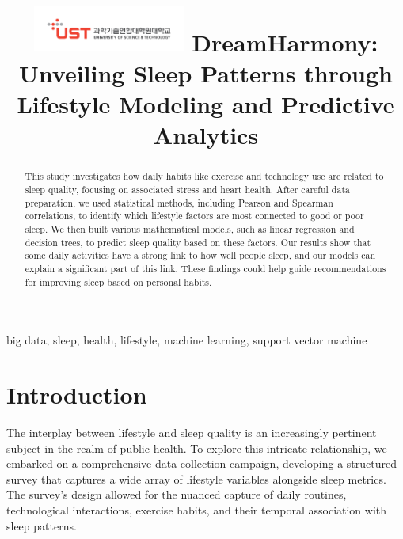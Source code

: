 \documentclass[conference]{IEEEtran}
\begin{document}

\title{\includegraphics[width=5cm]{images/ust.png} \linebreak DreamHarmony: Unveiling Sleep Patterns through Lifestyle Modeling and Predictive Analytics
}


\author{
}
\maketitle

\begin{abstract}
    This study investigates how daily habits like exercise and technology use are related to sleep quality, focusing on associated stress and heart health. After careful data preparation, we used statistical methods, including Pearson\cite{pearson} and Spearman correlations\cite{spearman}, to identify which lifestyle factors are most connected to good or poor sleep. We then built various mathematical models, such as linear regression and decision trees, to predict sleep quality based on these factors. Our results show that some daily activities have a strong link to how well people sleep, and our models can explain a significant part of this link. These findings could help guide recommendations for improving sleep based on personal habits.
\end{abstract}

\begin{IEEEkeywords}
    big data, sleep, health, lifestyle, machine learning, support vector machine
\end{IEEEkeywords}

\section{Introduction}
The interplay between lifestyle and sleep quality is an increasingly pertinent subject in the realm of public health. To explore this intricate relationship, we embarked on a comprehensive data collection campaign, developing a structured survey that captures a wide array of lifestyle variables alongside sleep metrics. The survey's design allowed for the nuanced capture of daily routines, technological interactions, exercise habits, and their temporal association with sleep patterns.
\end{document}
